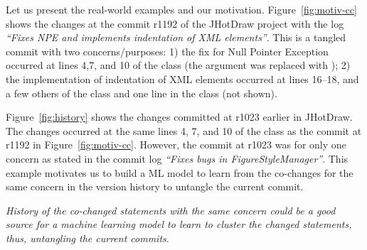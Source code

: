 Let us present the real-world examples and our
motivation. Figure~\ref{fig:motiv-cc} shows the changes at the commit
r1192 of the JHotDraw project with the log {\em ``Fixes NPE and
  implements indentation of XML elements''}. This is a tangled commit
with two concerns/purposes: 1) the fix for Null Pointer Exception
occurred at lines 4,7, and 10 of the  class (the
 argument was replaced with
); 2) the implementation of indentation
of XML elements occurred at lines 16--18, and a few others of the
 class and one line in the  class (not
shown).

Figure~\ref{fig:history} shows the changes committed at r1023 earlier
in JHotDraw. The changes occurred at the same lines 4, 7, and 10 of
the  class as the commit at r1192 in
Figure~\ref{fig:motiv-cc}. However, the commit at r1023 was for only
one concern as stated in the commit log {\em ``Fixes bugs in
  FigureStyleManager''}. This example motivates us to build a ML model
to learn from the co-changes for the same concern in the version
history to untangle the current commit.




 {\em
  History of the co-changed statements with the same concern could be
  a good source for a machine learning model to learn to cluster the
  changed statements, thus, untangling the current commits}.

